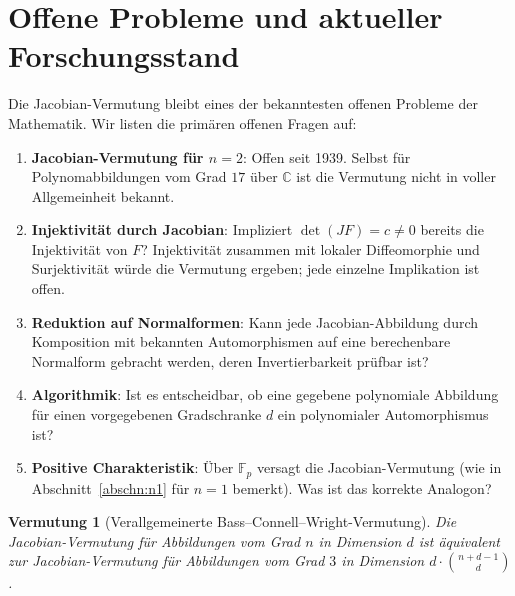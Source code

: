 \documentclass[12pt,a4paper]{amsart}
\newtheorem{vermutung}[theorem]{Vermutung}
\theoremstyle{definition}
\theoremstyle{remark}
\begin{document}

\section{Offene Probleme und aktueller Forschungsstand}
\label{abschn:open}

Die Jacobian-Vermutung bleibt eines der bekanntesten offenen Probleme der Mathematik.
Wir listen die primären offenen Fragen auf:

\begin{enumerate}[label=(\arabic*)]
  \item \textbf{Jacobian-Vermutung für $n = 2$}: Offen seit 1939. Selbst für
        Polynomabbildungen vom Grad $17$ über $\mathbb{C}$ ist die Vermutung nicht in
        voller Allgemeinheit bekannt.

  \item \textbf{Injektivität durch Jacobian}: Impliziert $\det(JF) = c \neq 0$
        bereits die Injektivität von $F$? Injektivität zusammen mit lokaler
        Diffeomorphie und Surjektivität würde die Vermutung ergeben; jede einzelne
        Implikation ist offen.

  \item \textbf{Reduktion auf Normalformen}: Kann jede Jacobian-Abbildung durch
        Komposition mit bekannten Automorphismen auf eine berechenbare Normalform
        gebracht werden, deren Invertierbarkeit prüfbar ist?

  \item \textbf{Algorithmik}: Ist es entscheidbar, ob eine gegebene polynomiale
        Abbildung für einen vorgegebenen Gradschranke $d$ ein polynomialer
        Automorphismus ist?

  \item \textbf{Positive Charakteristik}: Über $\mathbb{F}_p$ versagt die
        Jacobian-Vermutung (wie in Abschnitt~\ref{abschn:n1} für $n=1$ bemerkt).
        Was ist das korrekte Analogon?
\end{enumerate}

\begin{vermutung}[Verallgemeinerte Bass--Connell--Wright-Vermutung]\label{verm:genBCW}
Die Jacobian-Vermutung für Abbildungen vom Grad $n$ in Dimension $d$ ist äquivalent
zur Jacobian-Vermutung für Abbildungen vom Grad $3$ in Dimension
$d \cdot \binom{n+d-1}{d}$.
\end{vermutung}
\end{document}

